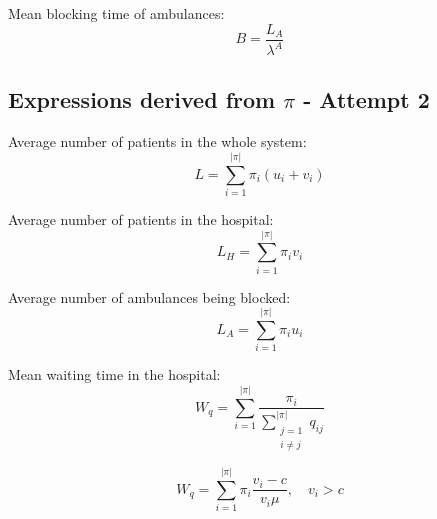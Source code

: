 \documentclass{article}
\begin{document}
Mean blocking time of ambulances:
\[
B = \frac{L_A}{\lambda^A}
\]

\newpage

\subsection{Expressions derived from \( \pi \) - Attempt 2}
Average number of patients in the whole system: 
\begin{equation}
    L = \sum_{i=1}^{|\pi|} \pi_i (u_i + v_i)
\end{equation} 

Average number of patients in the hospital: 
\begin{equation}
    L_H = \sum_{i=1}^{|\pi|} \pi_i v_i
\end{equation} 

Average number of ambulances being blocked:
\begin{equation}
    L_A = \sum_{i=1}^{|\pi|} \pi_i u_i
\end{equation}

Mean waiting time in the hospital:
\begin{equation}
    W_q = \sum_{i=1}^{|\pi|} \frac{\pi_i}{\sum_{\substack{j=1 \\ i \neq j}}^{|\pi|} q_{i j}}
\end{equation}

\begin{equation}
    W_q = \sum_{i=1}^{|\pi|} \pi_i \frac{v_i - c}{v_i \mu}, \quad v_i > c
\end{equation}


\newpage



\newpage
\end{document}
